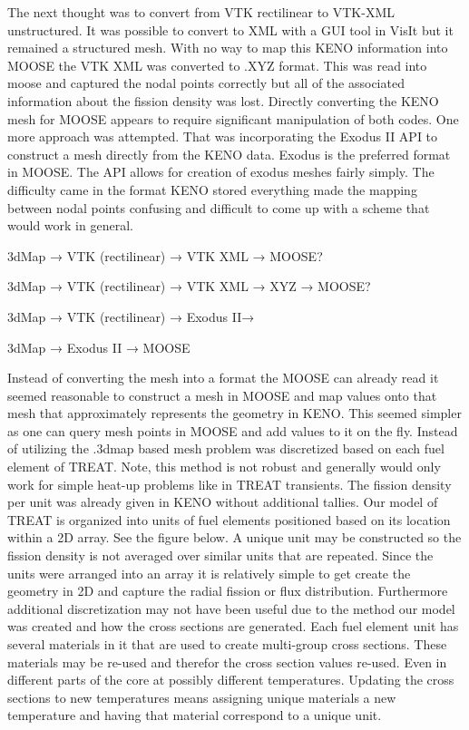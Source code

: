 \documentclass[11pt]{article}
\begin{document}
The next thought was to convert from VTK rectilinear to VTK-XML unstructured.  It was possible to convert to XML with a GUI tool in VisIt but it remained a structured mesh.  With no way to map this KENO information into MOOSE the VTK XML was converted to .XYZ format.  This was read into moose and captured the nodal points correctly but all of the associated information about the fission density was lost. Directly converting the KENO mesh for MOOSE appears to require significant manipulation of both codes.
	One more approach was attempted. That was incorporating the Exodus II API to construct a mesh directly from the KENO data.  Exodus is the preferred format in MOOSE.  The API allows for creation of exodus meshes fairly simply.  The difficulty came in the format KENO stored everything made the mapping between nodal points confusing and difficult to come up with a scheme that would work in general.  
	
3dMap → VTK (rectilinear) → VTK XML → MOOSE? 

3dMap → VTK (rectilinear) → VTK XML → XYZ → MOOSE?

3dMap → VTK (rectilinear) → Exodus II→

3dMap → Exodus II → MOOSE

Instead of converting the mesh into a format the MOOSE can already read it seemed reasonable to construct a mesh in MOOSE and map values onto that mesh that approximately represents the geometry in KENO.  This seemed simpler as one can query mesh points in MOOSE and add values to it on the fly.  Instead of utilizing the .3dmap based mesh problem was discretized based on each fuel element of TREAT.  Note, this method is not robust and generally would only work for simple heat-up problems like in TREAT transients.  The fission density per unit was already given in KENO without additional tallies.  Our model of TREAT is organized into units of fuel elements positioned based on its location within a 2D array. See the figure below.  A unique unit may be constructed so the fission density is not averaged over similar units that are repeated.  Since the units were arranged into an array it is relatively simple to get create the geometry in 2D and capture the radial fission or flux distribution.  Furthermore additional discretization may not have been useful due to the method our model was created and how the cross sections are generated.  Each fuel element unit has several materials in it that are used to create multi-group cross sections. These materials may be re-used and therefor the cross section values re-used.  Even in different parts of the core at possibly different temperatures.  Updating the cross sections to new temperatures means assigning unique materials a new temperature and having that material correspond to a unique unit.  
\end{document}
